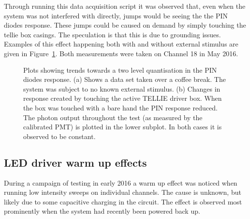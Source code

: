 \documentclass[12pt]{report}
\begin{document}
Through running this data acquisition script it was observed that, even when the system was not interfered with directly, jumps would be seeing the the PIN diodes response. These jumps could be caused on demand by simply touching the tellie box casings. The speculation is that this is due to grounding issues. Examples of this effect happening both with and without external stimulus are given in Figure~\ref{fig:PINQuantisation}. Both measurements were taken on Channel 18 in May 2016. 

\begin{figure}[htp]
	\centering
	\caption{Plots showing trends towards a two level quantisation in the PIN diodes response. (a) Shows a data set taken over a coffee break. The system was subject to no known external stimulus. (b) Changes in response created by touching the active TELLIE driver box. When the box was touched with a bare hand the PIN response reduced. The photon output throughout the test (as measured by the calibrated PMT) is plotted in the lower subplot. In both cases it is observed to be constant.}
	\label{fig:PINQuantisation} 
\end{figure}

\subsection{LED driver warm up effects}
During a campaign of testing in early 2016 a warm up effect was noticed when running low intensity sweeps on individual channels. The cause is unknown, but likely due to some capacitive charging in the circuit. The effect is observed most prominently when the system had recently been powered back up. 
\end{document}
